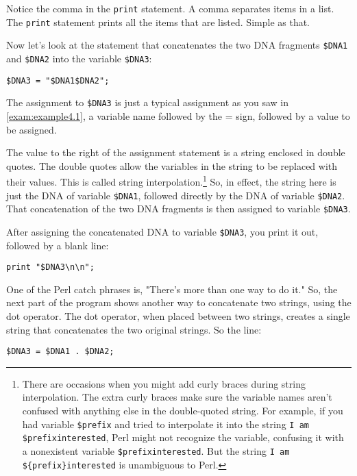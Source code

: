Notice the comma in the \verb|print| statement. A comma separates items in a list. The \verb|print| statement prints all the items that are listed. Simple as that.

Now let's look at the statement that concatenates the two DNA fragments \verb|$DNA1| and \verb|$DNA2| into the variable \verb|$DNA3|:

\begin{lstlisting}
$DNA3 = "$DNA1$DNA2"; 
\end{lstlisting}

The assignment to \verb|$DNA3| is just a typical assignment as you saw in \autoref{exam:example4.1}, a variable name followed by the = sign, followed by a value to be assigned.

The value to the right of the assignment statement is a string enclosed in double quotes. The double quotes allow the variables in the string to be replaced with their values. This is called string interpolation.\footnote{There are occasions when you might add curly braces during string interpolation. The extra curly braces make sure the variable names aren't confused with anything else in the double-quoted string. For example, if you had variable \verb|$prefix| and tried to interpolate it into the string \verb|I am $prefixinterested|, Perl might not recognize the variable, confusing it with a nonexistent variable \verb|$prefixinterested|. But the string \verb|I am ${prefix}interested| is unambiguous to Perl.} So, in effect, the string here is just the DNA of variable \verb|$DNA1|, followed directly by the DNA of variable \verb|$DNA2|. That concatenation of the two DNA fragments is then assigned to variable \verb|$DNA3|.

After assigning the concatenated DNA to variable \verb|$DNA3|, you print it out, followed by a blank line:

\begin{lstlisting}
print "$DNA3\n\n";
\end{lstlisting}

One of the Perl catch phrases is, "There's more than one way to do it." So, the next part of the program shows another way to concatenate two strings, using the dot operator. The dot operator, when placed between two strings, creates a single string that concatenates the two original strings. So the line:

\begin{lstlisting}
$DNA3 = $DNA1 . $DNA2;
\end{lstlisting}

